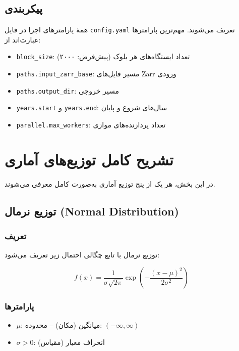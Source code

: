 \documentclass[a4paper,12pt]{article}
\begin{document}
\subsection{پیکربندی}

همهٔ پارامترهای اجرا در فایل \texttt{config.yaml} تعریف می‌شوند. مهم‌ترین پارامترها عبارت‌اند از:

\begin{itemize}
\item \texttt{block\_size}: تعداد ایستگاه‌های هر بلوک (پیش‌فرض: ۲۰۰۰)
\item \texttt{paths.input\_zarr\_base}: مسیر فایل‌های Zarr ورودی
\item \texttt{paths.output\_dir}: مسیر خروجی
\item \texttt{years.start} و \texttt{years.end}: سال‌های شروع و پایان
\item \texttt{parallel.max\_workers}: تعداد پردازنده‌های موازی
\end{itemize}

\section{تشریح کامل توزیع‌های آماری}

در این بخش، هر یک از پنج توزیع آماری به‌صورت کامل معرفی می‌شوند.

\subsection{توزیع نرمال (Normal Distribution)}

\subsubsection{تعریف}

توزیع نرمال با تابع چگالی احتمال زیر تعریف می‌شود:

\begin{equation}
f(x) = \frac{1}{\sigma\sqrt{2\pi}} \exp\left(-\frac{(x-\mu)^2}{2\sigma^2}\right)
\end{equation}

\subsubsection{پارامترها}

\begin{itemize}
\item $\mu$: میانگین (مکان) – محدوده: $(-\infty, \infty)$
\item $\sigma > 0$: انحراف معیار (مقیاس)
\end{itemize}
\end{document}
